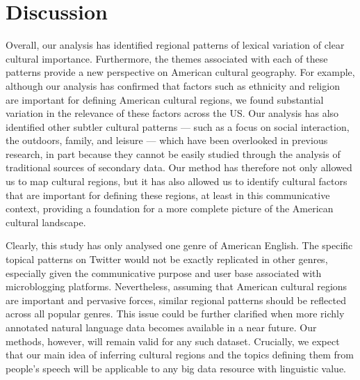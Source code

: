 \documentclass[../thesis.tex]{subfiles}
\begin{document}
\section{Discussion}
Overall, our analysis has identified regional patterns of lexical variation of
clear cultural importance. Furthermore, the themes associated with each of these
patterns provide a new perspective on American cultural geography. For example, although
our analysis has confirmed that factors such as ethnicity and religion are important for
defining American cultural regions, we found substantial variation in the relevance of
these factors across the US. Our analysis has also identified other subtler cultural
patterns --- such as a focus on social interaction, the outdoors, family, and
leisure --- which have been overlooked in previous research, in part because they cannot
be easily studied through the analysis of traditional sources of secondary data. Our
method has therefore not only allowed us to map cultural regions, but it has also
allowed us to identify cultural factors that are important for defining these regions,
at least in this communicative context, providing a foundation for a more complete
picture of the American cultural landscape.

Clearly, this study has only analysed one genre of American English. The specific topical
patterns on Twitter would not be exactly replicated in other genres, especially given
the communicative purpose and user base associated with microblogging platforms.
Nevertheless, assuming that American cultural regions are important and pervasive
forces, similar regional patterns should be reflected across all popular genres. This issue
could be further clarified when more richly annotated natural language data becomes
available in a near future. Our methods, however, will remain valid for any such
dataset. Crucially, we expect that our main idea of inferring cultural regions and the
topics defining them from people's speech will be applicable to any big data resource
with linguistic value.
\end{document}
